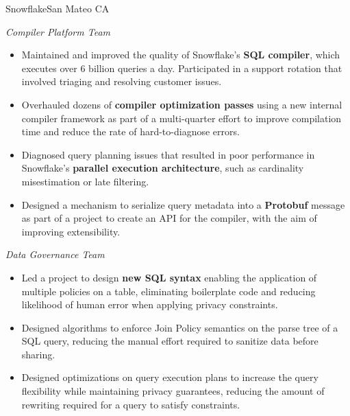 \documentclass{moderncv}
\begin{document}
{Snowflake}{San Mateo CA}{}
{
    \textit{Compiler Platform Team}
    \begin{itemize}
        \item Maintained and improved the quality of Snowflake's \textbf{SQL compiler}, which executes over 6 billion queries a day. Participated in a support rotation that involved triaging and resolving customer issues.
        \item Overhauled dozens of \textbf{compiler optimization passes} using a new internal compiler framework as part of a multi-quarter effort to improve compilation time and reduce the rate of hard-to-diagnose errors.
        \item Diagnosed query planning issues that resulted in poor performance in Snowflake's \textbf{parallel execution architecture}, such as cardinality misestimation or late filtering.
        \item Designed a mechanism to serialize query metadata into a \textbf{Protobuf} message as part of a project to create an API for the compiler, with the aim of improving extensibility.
    \end{itemize}
    \textit{Data Governance Team}
    \begin{itemize}
        \item Led a project to design \textbf{new SQL syntax} enabling the application of multiple policies on a table, eliminating boilerplate code and reducing likelihood of human error when applying privacy constraints. %
        \item Designed algorithms to enforce Join Policy semantics on the parse tree of a SQL query, reducing the manual effort required to sanitize data before sharing. %
        \item Designed optimizations on query execution plans to increase the query flexibility while maintaining privacy guarantees, reducing the amount of rewriting required for a query to satisfy constraints.  %
    \end{itemize}
}
\end{document}
